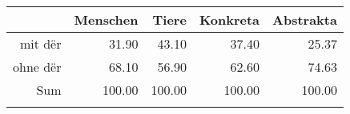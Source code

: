 \begin{tabular}{rrrrr}
  \lsptoprule
 & Menschen & Tiere & Konkreta & Abstrakta \\ 
  \midrule
mit dër & 31.90 & 43.10 & 37.40 & 25.37 \\ 
  ohne dër & 68.10 & 56.90 & 62.60 & 74.63 \\ 
  Sum & 100.00 & 100.00 & 100.00 & 100.00 \\ 
   \lspbottomrule
\end{tabular}
